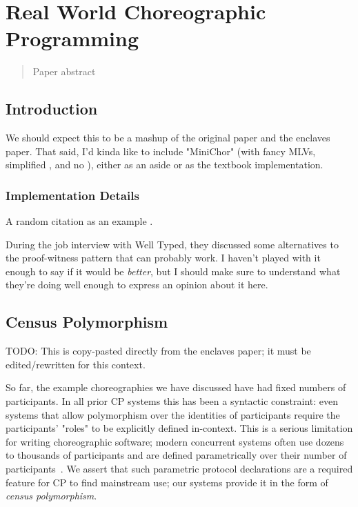 \chapter{Real World Choreographic Programming}
\label{sec:multichor}

\begin{quote}
Paper abstract
\end{quote}


\section{Introduction}
We should expect this to be a mashup of the original \MultiChor paper and the enclaves paper.
That said, I'd kinda like to include "MiniChor" (\MultiChor with fancy MLVs, simplified , and no ),
either as an aside or as the textbook implementation.

\subsection{Implementation Details}

A random citation as an example .

During the job interview with Well Typed, they discussed some alternatives to the proof-witness pattern that can probably work.
I haven't played with it enough to say if it would be \emph{better},
but I should make sure to understand what they're doing well enough to express an opinion about it here.

\section{Census Polymorphism}
\label{sec:census-poly}

TODO: This is copy-pasted directly from the enclaves paper; it must be edited/rewritten for this context.

So far, the example choreographies we have discussed have had fixed numbers of participants.
In all prior CP systems this has been a syntactic constraint:
even systems that allow polymorphism over the identities of participants require the participants' "roles" to be explicitly defined in-context.
This is a serious limitation for writing choreographic software;
modern concurrent systems often use dozens to thousands of participants
and are defined parametrically over their number of participants~\cite{bigConcurrent1, corrigan2017prio, bigConcurrent3, bigConcurrent4, dprio2023}.
We assert that such parametric protocol declarations are a required feature for CP to find mainstream use;
our systems provide it in the form of \emph{census polymorphism}.

